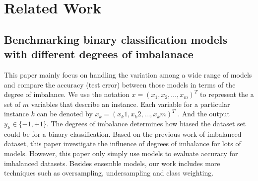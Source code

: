 \documentclass{article}
\begin{document}
\section{Related Work}
\label{gen_inst}
\subsection{Benchmarking binary classification models with different degrees of imbalanace}

This paper mainly focus on handling the variation among a wide range of models and compare the accuracy (test error) between those models in terms of the degree of imbalance. We use the notation $x = (x_1, x_2,...,x_m)^T$ to represent the a set of $m$ variables that describe an instance. Each variable for a particular instance $k$ can be denoted by $x_k = (x_k1, x_k2,...,x_km)^T$ \citep{ensemble}. And the output $y_k \in \{-1, +1\}$. The degrees of imbalance determines how biased the dataset set could be for a binary classification. Based on the previous work of imbalanced dataset\citep{CBSVM}, this paper investigate the influence of degrees of imbalance for lots of models. However, this paper only simply use models to evaluate accuracy for imbalanced datasets. Besides ensemble models, our work includes more techniques such as oversampling, undersampling and class weighting.
\end{document}

